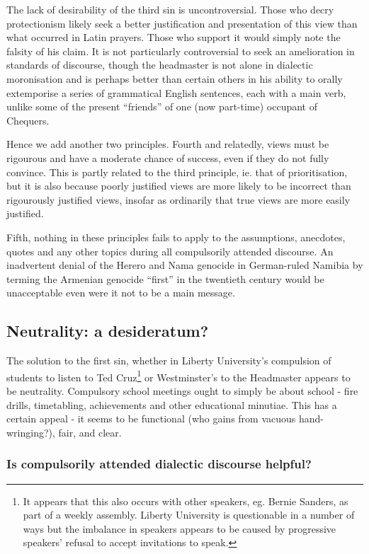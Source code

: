 \documentclass[12pt,a4paper]{report}
\begin{document}
\begin{multicols}{2}
\begin{multicols}{2}
The lack of desirability of the third sin is uncontroversial. Those who
decry protectionism likely seek a better justification and presentation
of this view than what occurred in Latin prayers. Those who support it
would simply note the falsity of his claim. It is not particularly
controversial to seek an amelioration in standards of discourse, though
the headmaster is not alone in dialectic moronisation and is perhaps
better than certain others in his ability to orally extemporise a series
of grammatical English sentences, each with a main verb, unlike some of
the present ``friends'' of one (now part-time) occupant of Chequers.

Hence we add another two principles. Fourth and relatedly, views must be
rigourous and have a moderate chance of success, even if they do not
fully convince. This is partly related to the third principle, ie. that
of prioritisation, but it is also because poorly justified views are
more likely to be incorrect than rigourously justified views, insofar as
ordinarily that true views are more easily justified.

Fifth, nothing in these principles fails to apply to the assumptions,
anecdotes, quotes and any other topics during all compulsorily attended
discourse. An inadvertent denial of the Herero and Nama genocide in
German-ruled Namibia by terming the Armenian genocide ``first'' in the
twentieth century would be unacceptable even were it not to be a main
message.

\subsection{Neutrality: a
	desideratum?}\label{neutrality-a-desideratum}

The solution to the first sin, whether in Liberty University's
compulsion of students to listen to Ted Cruz\footnote{It appears that
	this also occurs with other speakers, eg. Bernie Sanders, as part of a
	weekly assembly. Liberty University is questionable in a number of
	ways but the imbalance in speakers appears to be caused by progressive
	speakers' refusal to accept invitations to speak.} or Westminster's to
the Headmaster appears to be neutrality. Compulsory school meetings
ought to simply be about school - fire drills, timetabling, achievements
and other educational minutiae. This has a certain appeal - it seems to
be functional (who gains from vacuous hand-wringing?), fair, and clear.

\subsubsection{Is compulsorily attended dialectic discourse
	helpful?}\label{is-compulsorily-attended-dialectic-discourse-helpful}


\end{multicols}
\end{multicols}
\end{document}
